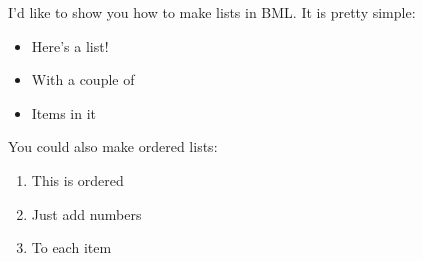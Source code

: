 \documentclass[a4paper]{article}
\begin{document}
I'd like to show you how to make lists in BML. It is pretty
simple:
\bigbreak
\begin{itemize}
\item Here's a list!

\item With a couple of

\item Items in it

\end{itemize}
\bigbreak
You could also make ordered lists:
\bigbreak
\begin{enumerate}
\item This is ordered

\item Just add numbers

\item To each item

\end{enumerate}
\bigbreak
\end{document}
